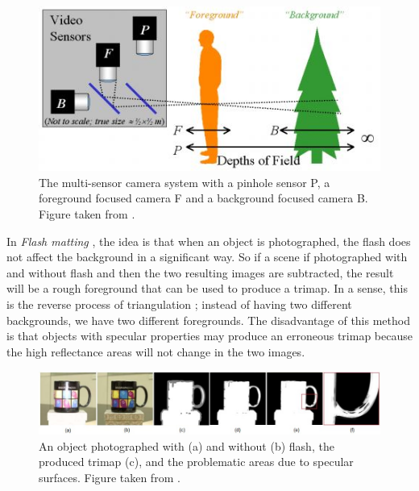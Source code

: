 \begin{figure}[t!]
\centering
\includegraphics[width=0.9\columnwidth]{Chapter2/2/defocus_figure_1.jpg}
\caption[Defocus matting setup.]{The multi-sensor camera system with a pinhole sensor P, a foreground focused camera F and a background focused camera B. Figure taken from \cite{defocus}.}
\label{fig:defocus-f1}
\end{figure}

In \textit{Flash matting} \cite{flash}, the idea is that when an object is photographed, the flash does not affect the background in a significant way. So if a scene if photographed with and without flash and then the two resulting images are subtracted, the result will be a rough foreground that can be used to produce a trimap. In a sense, this is the reverse process of triangulation \cite{blue}; instead of having two different backgrounds, we have two different foregrounds. The disadvantage of this method is that objects with specular properties may produce an erroneous trimap because the high reflectance areas will not change in the two images.

\begin{figure}[t!]
\centering
\includegraphics[width=1\columnwidth]{Chapter2/2/flash_figure_1.jpg}
\caption[Flash matting images and results.]{An object photographed with (a) and without (b) flash, the produced trimap (c), and the problematic areas due to specular surfaces. Figure taken from \cite{flash}.}
\label{fig:flash-f1}
\end{figure}

